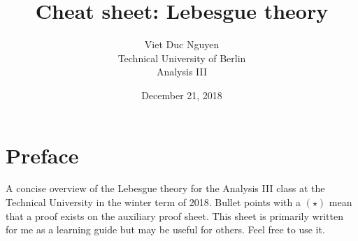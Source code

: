 \documentclass[a4paper, 11pt]{article}
\theoremstyle{plain}
\theoremstyle{definition}
\begin{document}
\title{Cheat sheet: Lebesgue theory}
\author{Viet Duc Nguyen\\ Technical University of Berlin\\ Analysis III}
\date{December 21, 2018}
\maketitle
\tableofcontents

\setcounter{section}{-1}
\section{Preface}
A concise overview of the Lebesgue theory for the Analysis III class at the Technical University in the winter term of 2018. Bullet points with a $(\star)$ mean that a proof exists on the auxiliary proof sheet. This sheet is primarily written for me as a learning guide but may be useful for others. Feel free to use it.
\end{document}
